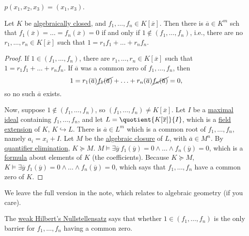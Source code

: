 \begin{eg}
	\(p(x_1, x_2, x_3) = (x_1, x_3)\).
\end{eg}

\begin{theorem}\label{thm:weak-Hilbert-Nullstellensatz}
	Let \(K\) be \hyperref[def:algebraically-closed]{algebraically closed}, and \(f_1, \ldots , f_n\in K[\overline{x} ]\). Then there is \(\overline{a} \in K^m\) sch that \(f_1(\overline{x} ) = \ldots = f_n(\overline{x} ) = 0\) if and only if \(1 \notin (f_1, \ldots , f_n)\), i.e., there are no \(r_1, \ldots , r_n\in K[\overline{x} ]\) such that \(1 = r_1 f_1 + \ldots + r_n f_n\).
\end{theorem}
\begin{proof}
	If \(1\in (f_1, \ldots , f_n)\), there are \(r_1, \ldots , r_n\in K[\overline{x} ]\) such that \(1 = r_1 f_1 + \ldots + r_n f_n\). If \(\overline{a} \) was a common zero of \(f_1, \ldots , f_n\), then
	\[
		1 = r_1(\overline{a} ) \cancel{f_1(\overline{a} )} + \ldots + r_n(\overline{a} ) \cancel{f_n(\overline{a} )} = 0,
	\]
	so no such \(\overline{a} \) exists.

	Now, suppose \(1 \notin (f_1, \ldots , f_n)\), so \((f_1, \ldots , f_n) \neq K[\overline{x} ]\). Let \(I\) be a \hyperref[def:maximal]{maximal} \hyperref[def:ideal]{ideal} containing \(f_1, \ldots , f_n\), and let \(L = \quotient{K[\overline{x} ]}{I} \), which is a \hyperref[def:field-extension]{field extension} of \(K\), \(K\hookrightarrow L\). There is \(\overline{a} \in L^m\) which is a common root of \(f_1, \ldots , f_n\), namely \(a_i = x_i + I\). Let \(M\) be the \hyperref[def:algebraic-closure]{algebraic closure} of \(L\), with \(\overline{a} \in M^n\). By \hyperref[def:quantifier-elimination]{quantifier elimination}, \(K \succeq M\). \(M \models \exists \overline{y} \ f_1(\overline{y} ) = 0 \land \ldots \land f_n(\overline{y} ) = 0\), which is a \hyperref[def:formula]{formula} about elements of \(K\) (the coefficients). Because \(K \succeq M\), \(K \models \exists \overline{y} \ f_1(\overline{y} ) = 0 \land \ldots \land f_n(\overline{y} ) = 0\), which says that \(f_1, \ldots , f_n\) have a common zero of \(K\).
\end{proof}

\begin{note}
	We leave the full version in the note, which relates to algebraic geometry (if you care).
\end{note}

\begin{remark}
	The \hyperref[thm:weak-Hilbert-Nullstellensatz]{weak Hilbert's Nullstellensatz} says that whether \(1\in (f_1, \ldots , f_n)\) is the only barrier for \(f_1, \ldots , f_n\) having a common zero.
\end{remark}

